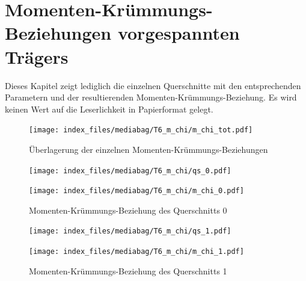 \documentclass[
  11pt,
  letterpaper,
]{scrreprt}
\begin{document}
\chapter{Momenten-Krümmungs-Beziehungen vorgespannten
Trägers}\label{momenten-kruxfcmmungs-beziehungen-vorgespannten-truxe4gers}


Dieses Kapitel zeigt lediglich die einzelnen Querschnitte mit den
entsprechenden Parametern und der resultierenden
Momenten-Krümmungs-Beziehung. Es wird keinen Wert auf die Leserlichkeit
in Papierformat gelegt.

\begin{figure}[H]

{\centering \texttt{[image: index\_files/mediabag/T6\_m\_chi/m\_chi\_tot.pdf]}

}

\caption{Überlagerung der einzelnen Momenten-Krümmungs-Beziehungen}

\end{figure}%

\begin{figure}[H]

\begin{minipage}{0.50\linewidth}
\texttt{[image: index\_files/mediabag/T6\_m\_chi/qs\_0.pdf]}\end{minipage}%
%
\begin{minipage}{0.50\linewidth}
\texttt{[image: index\_files/mediabag/T6\_m\_chi/m\_chi\_0.pdf]}\end{minipage}%

\caption{\label{fig-mchi_anhang}Momenten-Krümmungs-Beziehung des
Querschnitts 0}

\end{figure}%

\begin{figure}[H]

\begin{minipage}{0.50\linewidth}
\texttt{[image: index\_files/mediabag/T6\_m\_chi/qs\_1.pdf]}\end{minipage}%
%
\begin{minipage}{0.50\linewidth}
\texttt{[image: index\_files/mediabag/T6\_m\_chi/m\_chi\_1.pdf]}\end{minipage}%

\caption{\label{fig-mchi_anhang}Momenten-Krümmungs-Beziehung des
Querschnitts 1}

\end{figure}%
\end{document}
